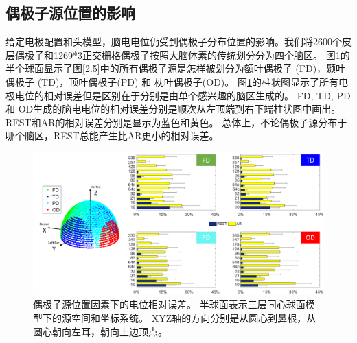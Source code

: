 \subsection{偶极子源位置的影响}
给定电极配置和头模型，脑电电位仍受到偶极子分布位置的影响。我们将2600个皮层偶极子和1269*3正交栅格偶极子按照大脑体素的传统划分分为四个脑区。 
图\ref{2.6}的半个球面显示了图\ref{2.5}中的所有偶极子源是怎样被划分为额叶偶极子 (FD)，颞叶偶极子 (TD)，顶叶偶极子(PD) 和 枕叶偶极子(OD)。 图\ref{2.6}的柱状图显示了所有电极电位的相对误差但是区别在于分别是由单个感兴趣的脑区生成的。 FD, TD, PD 
和 OD生成的脑电电位的相对误差分别是顺次从左顶端到右下端柱状图中画出。REST和AR的相对误差分别是显示为蓝色和黄色。 总体上，不论偶极子源分布于哪个脑区，REST总能产生比AR更小的相对误差。
\begin{figure}[h!]
	\centering
	\includegraphics[width=15cm]{pic/JNE/figure6.png}
	\caption{偶极子源位置因素下的电位相对误差。 半球面表示三层同心球面模型下的源空间和坐标系统。 XYZ轴的方向分别是从圆心到鼻根，从圆心朝向左耳，朝向上边顶点。}
	\label{2.6}
\end{figure}

